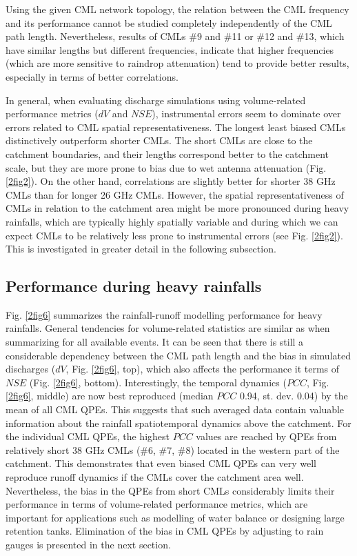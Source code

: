 \documentclass{ctuthesis}\usepackage[]{graphicx}\usepackage[]{color}
\begin{document}
Using the given CML network topology, the relation between the CML frequency and its performance cannot be studied completely independently of the CML path length. Nevertheless, results of CMLs \#9 and \#11 or \#12 and \#13, which have similar lengths but different frequencies, indicate that higher frequencies (which are more sensitive to raindrop attenuation) tend to provide better results, especially in terms of better correlations.
 
In general, when evaluating discharge simulations using volume-related performance metrics ($dV$ and $NSE$), instrumental errors seem to dominate over errors related to CML spatial representativeness. The longest least biased CMLs distinctively outperform shorter CMLs. The short CMLs are close to the catchment boundaries, and their lengths correspond better to the catchment scale, but they are more prone to bias due to wet antenna attenuation (Fig. \ref{2fig2}). On the other hand, correlations are slightly better for shorter 38 GHz CMLs than for longer 26 GHz CMLs. However, the spatial representativeness of CMLs in relation to the catchment area might be more pronounced during heavy rainfalls, which are typically highly spatially variable and during which we can expect CMLs to be relatively less prone to instrumental errors (see Fig. \ref{2fig2}). This is investigated in greater detail in the following subsection.

\subsection{Performance during heavy rainfalls}

Fig. \ref{2fig6} summarizes the rainfall-runoff modelling performance for heavy rainfalls. General tendencies for volume-related statistics are similar as when summarizing for all available events. It can be seen that there is still a considerable dependency between the CML path length and the bias in simulated discharges ($dV$, Fig. \ref{2fig6}, top), which also affects the performance it terms of $NSE$ (Fig. \ref{2fig6}, bottom). Interestingly, the temporal dynamics ($PCC$, Fig. \ref{2fig6}, middle) are now best reproduced (median $PCC$ 0.94, st. dev. 0.04) by the mean of all CML QPEs. This suggests that such averaged data contain valuable information about the rainfall spatiotemporal dynamics above the catchment. For the individual CML QPEs, the highest $PCC$ values are reached by QPEs from relatively short 38 GHz CMLs (\#6, \#7, \#8) located in the western part of the catchment. This demonstrates that even biased CML QPEs can very well reproduce runoff dynamics if the CMLs cover the catchment area well. Nevertheless, the bias in the QPEs from short CMLs considerably limits their performance in terms of volume-related performance metrics, which are important for applications such as modelling of water balance or designing large retention tanks. Elimination of the bias in CML QPEs by adjusting to rain gauges is presented in the next section.
\end{document}
